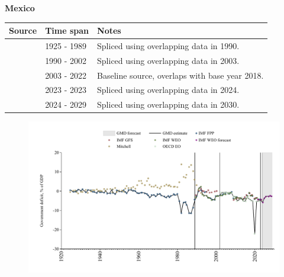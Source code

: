 \documentclass[12pt,a4paper,landscape]{article}
\begin{document}
\begin{adjustbox}{max totalsize={\paperwidth}{\paperheight},center}
\begin{minipage}[t][\textheight][t]{\textwidth}
\vspace*{0.5cm}
{}
\begin{center}
{\Large\bfseries Mexico}
\end{center}
\vspace{0.5cm}
\begin{table}[H]
\centering
\small
\begin{tabular}{|l|l|l|}
\hline
\textbf{Source} & \textbf{Time span} & \textbf{Notes} \\
\hline
\rowcolor{white}\cite{IMF_FPP}& 1925 - 1989 &Spliced using overlapping data in 1990.\\
\rowcolor{lightgray}\cite{IMF_WEO}& 1990 - 2002 &Spliced using overlapping data in 2003.\\
\rowcolor{white}\cite{OECD_EO}& 2003 - 2022 &Baseline source, overlaps with base year 2018.\\
\rowcolor{lightgray}\cite{IMF_GFS}& 2023 - 2023 &Spliced using overlapping data in 2024.\\
\rowcolor{white}\cite{IMF_WEO_forecast}& 2024 - 2029 &Spliced using overlapping data in 2030.\\
\hline
\end{tabular}
\end{table}
\begin{figure}[H]
\centering
\includegraphics[width=\textwidth,height=0.6\textheight,keepaspectratio]{graphs/MEX_govdef_GDP.pdf}
\end{figure}
\end{minipage}
\end{adjustbox}
\end{document}
